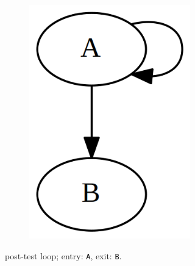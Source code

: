 \begin{figure}[htbp]
\begin{subfigure}[ht]{0.30\textwidth}
\begin{subfigure}[ht]{0.35\textwidth}
			\includegraphics[width=\textwidth]{inc/primitives/post_loop.png}
		\end{subfigure}
		\caption{post-test loop; entry: \texttt{A}, exit: \texttt{B}.}
		\label{fig:post_loop_graph_representation}
	\end{subfigure}
	\qquad
	\begin{subfigure}[ht]{0.24\textwidth}
		\centering
		\begin{subfigure}[ht]{0.20\textwidth}
			
		\end{subfigure}
		\begin{subfigure}[ht]{0.35\textwidth}

\end{subfigure}
\end{subfigure}
\end{figure}
